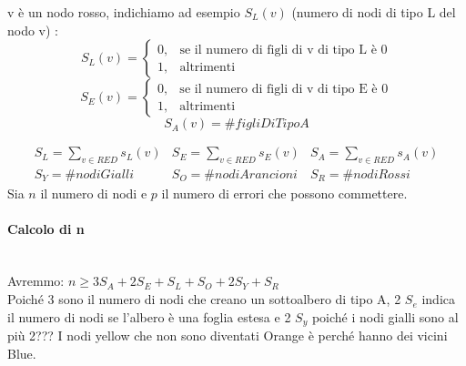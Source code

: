 v è un nodo rosso, indichiamo ad esempio $S_L(v)$ (numero di nodi di tipo L del
nodo v) :
\begin{equation}\nonumber
    S_L(v) = \begin{cases} 0, & \mbox{se il numero di figli di v di tipo L è 0} \\
              1, & \mbox{altrimenti}\end{cases}
\end{equation}
\begin{equation}\nonumber
    S_E(v) = \begin{cases} 0, & \mbox{se il numero di figli di v di tipo E è 0} \\
              1, & \mbox{altrimenti}\end{cases}
\end{equation}
\begin{equation}\nonumber
    S_A(v) = \#figliDiTipo A
\end{equation}

\begin{equation}
    \begin{array}{ccc}
        S_L = \sum_{v \in RED} s_L(v) &
        S_E = \sum_{v \in RED} s_E(v) &
        S_A = \sum_{v \in RED} s_A(v)   \\
        S_Y = \#nodiGialli            &
        S_O = \#nodiArancioni         &
        S_R = \#nodiRossi
    \end{array}
\end{equation}
Sia $n$ il numero di nodi e $p$ il numero di errori che possono commettere.
\paragraph{Calcolo di n}\ \\
Avremmo: $n \geq 3 S_A + 2 S_E + S_L + S_O + 2 S_Y + S_R$\\
Poiché 3 sono il numero di nodi che creano un sottoalbero di tipo A, 2 $S_e$
indica il numero di nodi se l'albero è una foglia estesa e 2 $S_y$ poiché i nodi
gialli sono al più 2??? I nodi yellow che non sono diventati Orange è perché
hanno dei vicini Blue.
